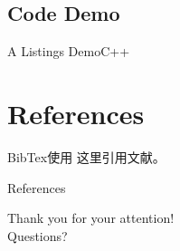 \documentclass[
10pt,
aspectratio=43,
]{beamer}
\begin{document}
\subsection{Code Demo}
\begin{frame}{A Listings Demo}{C++}
	\lstI
\end{frame}

\section{References}

\begin{frame}{BibTex使用}
    这里引用文献\cite{9492070}。
\end{frame}

\begin{frame}{References}



\end{frame}
\begin{frame}[plain]
	\vfill
	\centering
	{
		\centering \Huge \color{white} Thank you for your attention!\\[10pt]Questions?
	}
	\vfill
\end{frame}
\end{document}
